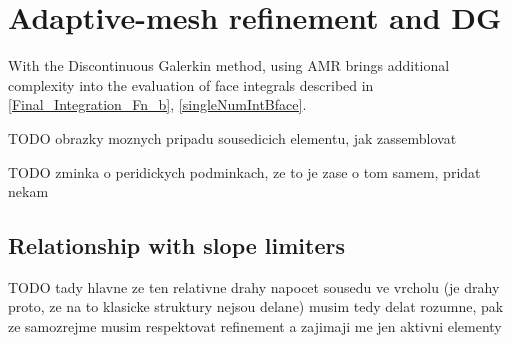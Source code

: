 \section{Adaptive-mesh refinement and DG}
With the Discontinuous Galerkin method, using AMR brings additional complexity into the evaluation of face integrals described in \ref{Final_Integration_Fn_b}, \ref{singleNumIntBface}.

TODO obrazky moznych pripadu sousedicich elementu, jak zassemblovat

TODO zminka o peridickych podminkach, ze to je zase o tom samem, pridat nekam \label{amrPer}

\subsection{Relationship with slope limiters}

TODO tady hlavne ze ten relativne drahy napocet sousedu ve vrcholu (je drahy proto, ze na to klasicke struktury nejsou delane) musim tedy delat rozumne, pak ze samozrejme musim respektovat refinement a zajimaji me jen aktivni elementy